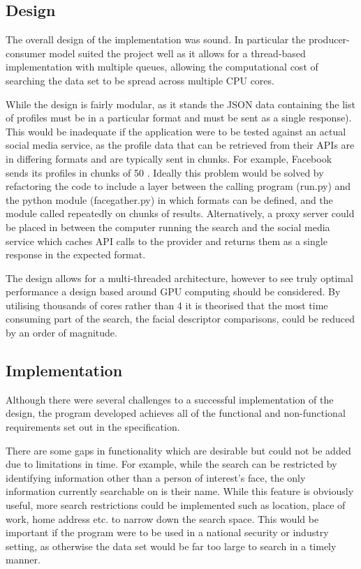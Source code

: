 \documentclass[12pt]{article}
\begin{document}
\subsection{Design}
The overall design of the implementation was sound. In particular the producer-consumer model suited the project well as it allows for a thread-based implementation with multiple queues, allowing the computational cost of searching the data set to be spread across multiple CPU cores.

While the design is fairly modular, as it stands the JSON data containing the list of profiles must be in a particular format and must be sent as a single response). This would be inadequate if the application were to be tested against an actual social media service, as the profile data that can be retrieved from their APIs are in differing formats and are typically sent in chunks. For example, Facebook sends its profiles in chunks of 50 \citep{facebookgraphapi}. Ideally this problem would be solved by refactoring the code to include a layer between the calling program (run.py) and the python module (facegather.py) in which formats can be defined, and the module called repeatedly on chunks of results. Alternatively, a proxy server could be placed in between the computer running the search and the social media service which caches API calls to the provider and returns them as a single response in the expected format.

The design allows for a multi-threaded architecture, however to see truly optimal performance a design based around GPU computing should be considered. By utilising thousands of cores rather than 4 it is theorised that the most time consuming part of the search, the facial descriptor comparisons, could be reduced by an order of magnitude.

\subsection{Implementation}
Although there were several challenges to a successful implementation of the design, the program developed achieves all of the functional and non-functional requirements set out in the specification.

There are some gaps in functionality which are desirable but could not be added due to limitations in time. For example, while the search can be restricted by identifying information other than a person of interest's face, the only information currently searchable on is their name. While this feature is obviously useful, more search restrictions could be implemented such as location, place of work, home address etc. to narrow down the search space. This would be important if the program were to be used in a national security or industry setting, as otherwise the data set would be far too large to search in a timely manner.
\end{document}
